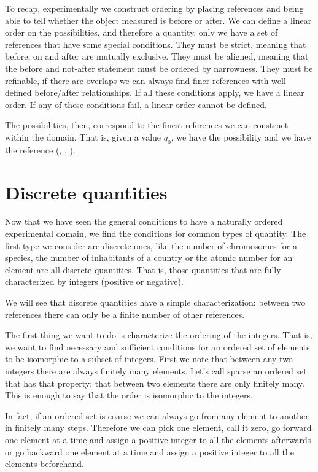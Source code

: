 \documentclass[11pt,letterpaper,fleqn]{memoir} %
\begin{document}
To recap, experimentally we construct ordering by placing references and being able to tell whether the object measured is before or after. We can define a linear order on the possibilities, and therefore a quantity, only we have a set of references that have some special conditions. They must be strict, meaning that before, on and after are mutually exclusive. They must be aligned, meaning that the before and not-after statement must be ordered by narrowness. They must be refinable, if there are overlaps we can always find finer references with well defined before/after relationships. If all these conditions apply, we have a linear order. If any of these conditions fail, a linear order cannot be defined.

The possibilities, then, correspond to the finest references we can construct within the domain. That is, given a value $q_0$, we have the possibility  and we have the reference (, , ).

\section{Discrete quantities}

Now that we have seen the general conditions to have a naturally ordered experimental domain, we find the conditions for common types of quantity. The first type we consider are discrete ones, like the number of chromosomes for a species, the number of inhabitants of a country or the atomic number for an element are all discrete quantities. That is, those quantities that are fully characterized by integers (positive or negative).

We will see that discrete quantities have a simple characterization: between two references there can only be a finite number of other references.

The first thing we want to do is characterize the ordering of the integers. That is, we want to find necessary and sufficient conditions for an ordered set of elements to be isomorphic to a subset of integers. First we note that between any two integers there are always finitely many elements. Let's call sparse an ordered set that has that property: that between two elements there are only finitely many. This is enough to say that the order is isomorphic to the integers.

In fact, if an ordered set is coarse we can always go from any element to another in finitely many steps. Therefore we can pick one element, call it zero, go forward one element at a time and assign a positive integer to all the elements afterwards or go backward one element at a time and assign a positive integer to all the elements beforehand.
\end{document}
